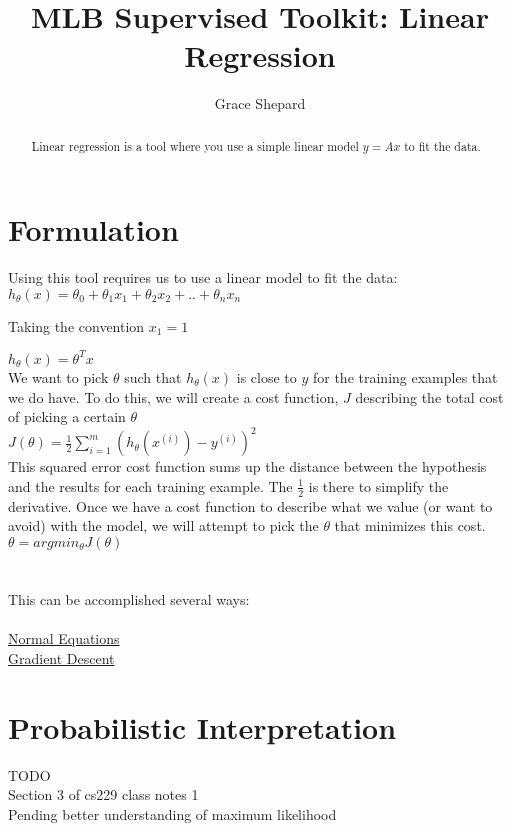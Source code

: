 \documentclass{article}
\begin{document}
\title{MLB Supervised Toolkit: Linear Regression}
\author{Grace Shepard}

\maketitle

\begin{abstract}
Linear regression is a tool where you use a simple linear model $y=Ax$ to fit the data.
\end{abstract}


\section{Formulation}
Using this tool requires us to use a linear model to fit the data:\\

$h_{\theta}(x) = \theta_0 + \theta_1x_1 + \theta_2x_2 + .. + \theta_nx_n$\\

\begin{flushright}Taking the convention $x_1 = 1$\\
\end{flushright}

$h_{\theta}(x) = \theta^Tx$ \\

We want to pick $\theta$ such that $h_\theta(x)$ is close to $y$ for the training examples that we do have. To do this, we will create a cost function, $J$ describing the total cost of picking a certain $\theta$\\

$J(\theta) = \frac{1}{2} \sum_{i=1}^m {(h_\theta(x^{(i)}) - y^{(i)})}^2$ \\

This squared error cost function sums up the distance between the hypothesis and the results for each training example. The $\frac{1}{2}$ is there to simplify the derivative. Once we have a cost function to describe what we value (or want to avoid) with the model, we will attempt to pick the $\theta$ that minimizes this cost.\\

$\theta = argmin_\theta J(\theta)$\\
\\
\\
This can be accomplished several ways:\\
\\
\href{normal-equations.pdf}{Normal Equations}\\
\href{gradient-descent.pdf}{Gradient Descent}\\

\section{Probabilistic Interpretation}
TODO\\
Section 3 of cs229 class notes 1\\
Pending better understanding of maximum likelihood\\
\end{document}
